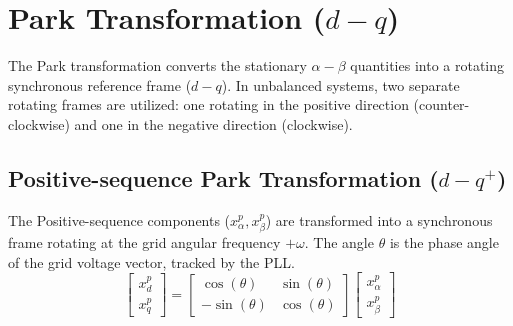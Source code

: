 \section{Park Transformation  (\texorpdfstring{$d-q$}{dq})}
The Park transformation converts the stationary $\alpha-\beta$ quantities into a rotating synchronous reference frame ($d-q$).
In unbalanced systems, two separate rotating frames are utilized: one rotating in the positive direction (counter-clockwise)
and one in the negative direction (clockwise).
\subsection{Positive-sequence Park Transformation (\texorpdfstring{$d-q^+$}{dq+})}
The Positive-sequence components ($x_{\alpha}^p, x_{\beta}^p$) are transformed into a synchronous frame rotating at the grid
angular frequency $+\omega$. The angle $\theta$ is the phase angle of the grid voltage vector, tracked by the PLL.
\begin{equation}
    \begin{bmatrix}
        x_d^p \\
        x_q^p
    \end{bmatrix}
    =
    \begin{bmatrix}
        \cos(\theta)  & \sin(\theta) \\
        -\sin(\theta) & \cos(\theta)
    \end{bmatrix}
    \begin{bmatrix}
        x_{\alpha}^p \\
        x_{\beta}^p
    \end{bmatrix}
\end{equation}

